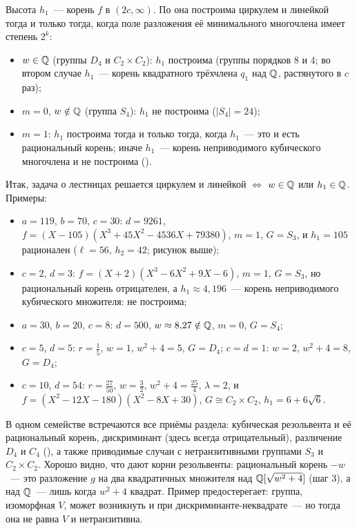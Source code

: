 \begin{remark}
Высота $h_1$~--- корень $f$ в $(2c,\infty)$. По  она построима циркулем и линейкой тогда и только тогда, когда поле разложения
её минимального многочлена имеет степень $2^k$:
\begin{itemize}
\item $w\in\mathbb Q$ (группы $D_4$ и $C_2\times C_2$): $h_1$ построима (группы порядков $8$ и $4$; во втором случае $h_1$~--- корень квадратного
трёхчлена $q_1$ над $\mathbb Q$, растянутого в $c$ раз);
\item $m=0$, $w\notin\mathbb Q$ (группа $S_4$): $h_1$ не построима ($|S_4|=24$);
\item $m=1$: $h_1$ построима тогда и только тогда, когда $h_1$~--- это и есть рациональный корень; иначе $h_1$~--- корень неприводимого
кубического многочлена и не построима ().
\end{itemize}
Итак, задача о лестницах решается циркулем и линейкой $\iff$ $w\in\mathbb Q$ или $h_1\in\mathbb Q$. Примеры:
\begin{itemize}
\item $a=119$, $b=70$, $c=30$: $d=9261$, $f=(X-105)(X^3+45X^2-4536X+79380)$, $m=1$, $G=S_3$, и $h_1=105$ рационален ($\ell=56$, $h_2=42$;
рисунок выше);
\item $c=2$, $d=3$: $f=(X+2)(X^3-6X^2+9X-6)$, $m=1$, $G=S_3$, но рациональный корень отрицателен, а $h_1\approx4{,}196$~--- корень
неприводимого кубического множителя: не построима;
\item $a=30$, $b=20$, $c=8$: $d=500$, $w\approx8{,}27\notin\mathbb Q$, $m=0$, $G=S_4$;
\item $c=5$, $d=5$: $r=\frac15$, $w=1$, $w^2+4=5$, $G=D_4$; $c=d=1$: $w=2$, $w^2+4=8$, $G=D_4$;
\item $c=10$, $d=54$: $r=\frac{27}{50}$, $w=\frac32$, $w^2+4=\frac{25}4$, $\lambda=2$, и $f=(X^2-12X-180)(X^2-8X+30)$, $G\cong C_2\times C_2$, $h_1=6+6\sqrt6$.
\end{itemize}
\end{remark}

\begin{remark}
В одном семействе встречаются все приёмы раздела: кубическая резольвента и её рациональный корень, дискриминант (здесь
всегда отрицательный), различение $D_4$ и $C_4$ (), а также приводимые случаи с нетранзитивными группами $S_3$ и
$C_2\times C_2$. Хорошо видно, что дают корни резольвенты: рациональный корень $-w$~--- это разложение $g$ на два квадратичных
множителя над $\mathbb Q[\sqrt{w^2+4}]$ (шаг 3), а над $\mathbb Q$~--- лишь когда $w^2+4$ квадрат. Пример предостерегает: группа, изоморфная $V$,
может возникнуть и при дискриминанте-неквадрате~--- но тогда она не равна $V$ и нетранзитивна.
\end{remark}
